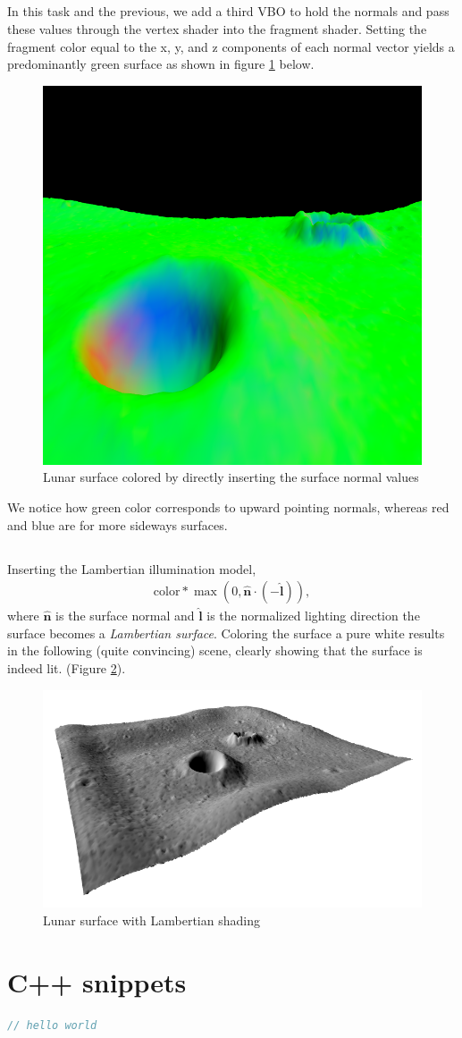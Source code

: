 \documentclass[]{article}
\begin{document}
\begin{multicols}{2}
\subsection{}
In this task and the previous, we add a third VBO to hold the normals and pass these values through the vertex shader into the fragment shader. Setting the fragment color equal to the x, y, and z components of each normal vector yields a predominantly green surface as shown in figure \ref{fig:green-surface} below.
\begin{figure}[H]
\centering
\includegraphics[width=0.5\columnwidth]{green-surface}
\caption{Lunar surface colored by directly inserting the surface normal values}
\label{fig:green-surface}
\end{figure}
We notice how green color corresponds to upward pointing normals, whereas red and blue are for more sideways surfaces.

\subsection{}
Inserting the Lambertian illumination model,
\begin{equation}\begin{aligned}
\text{color} * \max(0, \hat{\mathbf{n}} \cdot (- \hat{\mathbf{l}})),
\end{aligned}\end{equation}
where $\hat{\mathbf{n}}$ is the surface normal and $\hat{\mathbf{l}}$ is the normalized lighting direction the surface becomes a \textit{Lambertian surface}. Coloring the surface a pure white results in the following (quite convincing) scene, clearly showing that the surface is indeed lit. (Figure \ref{fig:lambert-surface}).
\begin{figure}[H]
\centering
\includegraphics[width=0.5\columnwidth]{lambert-surface}
\caption{Lunar surface with Lambertian shading}
\label{fig:lambert-surface}
\end{figure}
\end{multicols}
\appendix
\section{C++ snippets}
\begin{lstlisting}[language={C++}, caption={Vertices for 6 triangles}, label={lst:6_tris_1}]
// hello world
\end{lstlisting}
\end{document}
